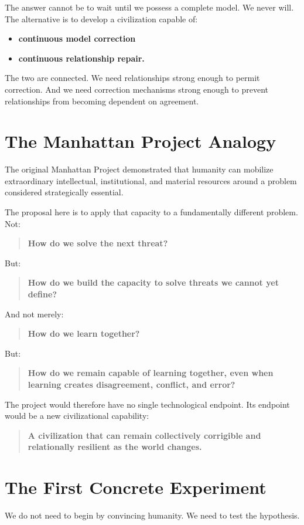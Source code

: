\documentclass{article}
\begin{document}
The answer cannot be to wait until we possess a complete model. We never will. The alternative is to develop a civilization capable of:
\begin{itemize}
    \item \textbf{continuous model correction}
    \item \textbf{continuous relationship repair.}
\end{itemize}

The two are connected. We need relationships strong enough to permit correction. And we need correction mechanisms strong enough to prevent relationships from becoming dependent on agreement.

\section{The Manhattan Project Analogy}
The original Manhattan Project demonstrated that humanity can mobilize extraordinary intellectual, institutional, and material resources around a problem considered strategically essential.

The proposal here is to apply that capacity to a fundamentally different problem. Not:
\begin{quote}
    \textbf{How do we solve the next threat?}
\end{quote}
But:
\begin{quote}
    \textbf{How do we build the capacity to solve threats we cannot yet define?}
\end{quote}

And not merely:
\begin{quote}
    \textbf{How do we learn together?}
\end{quote}
But:
\begin{quote}
    \textbf{How do we remain capable of learning together, even when learning creates disagreement, conflict, and error?}
\end{quote}

The project would therefore have no single technological endpoint. Its endpoint would be a new civilizational capability:
\begin{quote}
    \textbf{A civilization that can remain collectively corrigible and relationally resilient as the world changes.}
\end{quote}

\section{The First Concrete Experiment}
We do not need to begin by convincing humanity. We need to test the hypothesis.
\end{document}

